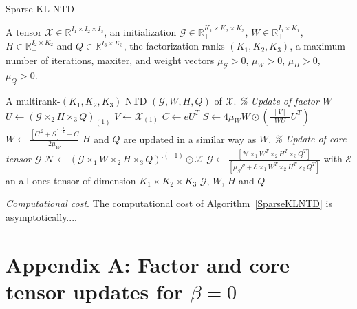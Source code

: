 \documentclass[a4paper, 11pt]{article}
\begin{document}
\begin{algorithm}[ht!]
\caption{Sparse KL-NTD \label{SparseKLNTD}}
\begin{algorithmic}[1] 
\REQUIRE A tensor $\mathcal{X} \in \mathbb{R}^{I_1 \times I_2 \times I_3}$, 
an initialization $\mathcal{G} \in \mathbb{R}^{K_1 \times K_2 \times K_3}_+$, $W \in \mathbb{R}^{I_1 \times K_1}_+$, $H \in \mathbb{R}^{I_2 \times K_2}_+$ and $Q  \in \mathbb{R}^{I_3 \times K_3}$, 
the factorization ranks $(K_1,K_2,K_3)$, a maximum number of iterations, maxiter, and weight vectors $\mu_{\mathcal{G}}>0$, $\mu_{W}>0$, $\mu_{H}>0$, $\mu_{Q}>0$.

\ENSURE A multirank-$(K_1,K_2,K_3)$ NTD $(\mathcal{G},W,H,Q)$ of $\mathcal{X}$.
    \medskip  
{}
    \STATE \emph{\% Update of factor $W$} 
    \STATE $U \leftarrow\left(\mathcal{G} \times_2 H \times_3 Q \right)_{(1)}$
    \STATE $V \leftarrow \mathcal{X}_{(1)}$
    \STATE $C \leftarrow eU^T$
    \STATE $S \leftarrow 4\mu_W W \odot \left( \frac{\left[ V \right]}{\left[ WU \right]} U^T\right) $
    \STATE $W \leftarrow \frac{\left[C^{.2}+S\right]^{.\frac{1}{2}}-C}{2 \mu_W}$
    \STATE $H$ and $Q$ are updated in a similar way as $W$. 
	\STATE \emph{\% Update of core tensor $\mathcal{G}$}
    \STATE $\mathcal{N} \leftarrow \left( \mathcal{G} \times_1 W \times_2 H \times_3 Q \right)^{.(-1)} \odot \mathcal{X}$
    \STATE $\mathcal{G} \leftarrow \frac{[\mathcal{N} \times_1 W^T \times_2 H^T \times_3 Q^T]}{[\mu_{\mathcal{G}} \mathcal{E} + \mathcal{E} \times_1 W^T \times_2 H^T \times_3 Q^T]}$ with $\mathcal{E}$ an all-ones tensor of dimension $K_1 \times K_2 \times K_3$
\ENDFOR
\RETURN $\mathcal{G}$, $W$, $H$ and $Q$
\end{algorithmic}  
\end{algorithm} 

\textit{Computational cost}. The computational cost of Algorithm~\ref{SparseKLNTD} is asymptotically....




\section*{Appendix A: Factor and core tensor updates for $\beta=0$}\label{AppendA}
\end{document}
